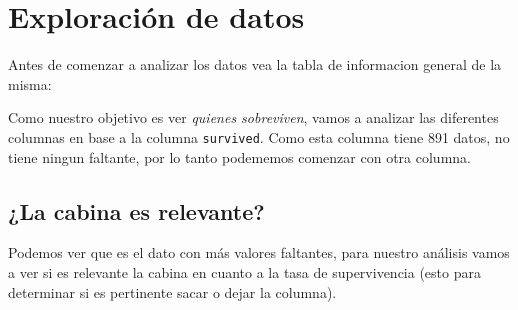 \chapter{Exploración de datos}

Antes de comenzar a analizar los datos vea la tabla de informacion general de la misma:


Como nuestro objetivo es ver \textit{quienes sobreviven}, vamos a analizar las diferentes columnas en base a la columna \texttt{survived}. Como esta columna tiene 891 datos, no tiene ningun faltante, por lo tanto podememos comenzar con otra columna.

\section{¿La cabina es relevante?}

Podemos ver que es el dato con más valores faltantes, para nuestro análisis vamos a ver si es relevante la cabina en cuanto a la tasa de supervivencia (esto para determinar si es pertinente sacar o dejar la columna).

